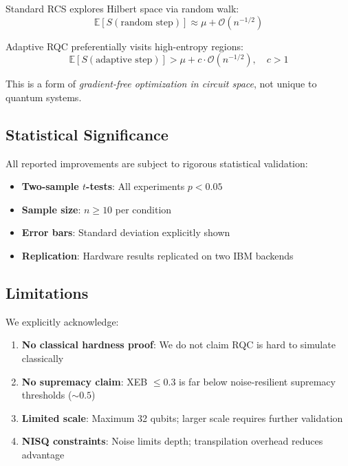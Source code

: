 \documentclass[twocolumn]{article}
\begin{document}
Standard RCS explores Hilbert space via random walk:
\begin{equation}
\mathbb{E}[S(\text{random step})] \approx \mu + \mathcal{O}(n^{-1/2})
\end{equation}

Adaptive RQC preferentially visits high-entropy regions:
\begin{equation}
\mathbb{E}[S(\text{adaptive step})] > \mu + c \cdot \mathcal{O}(n^{-1/2}), \quad c > 1
\end{equation}

This is a form of \textit{gradient-free optimization in circuit space}, not unique to quantum systems.

\subsection{Statistical Significance}

All reported improvements are subject to rigorous statistical validation:

\begin{itemize}
\item \textbf{Two-sample $t$-tests}: All experiments $p < 0.05$
\item \textbf{Sample size}: $n \geq 10$ per condition
\item \textbf{Error bars}: Standard deviation explicitly shown
\item \textbf{Replication}: Hardware results replicated on two IBM backends
\end{itemize}

\subsection{Limitations}

We explicitly acknowledge:

\begin{enumerate}
\item \textbf{No classical hardness proof}: We do not claim RQC is hard to simulate classically
\item \textbf{No supremacy claim}: XEB $\leq 0.3$ is far below noise-resilient supremacy thresholds ($\sim 0.5$)
\item \textbf{Limited scale}: Maximum 32 qubits; larger scale requires further validation
\item \textbf{NISQ constraints}: Noise limits depth; transpilation overhead reduces advantage
\end{enumerate}
\end{document}
